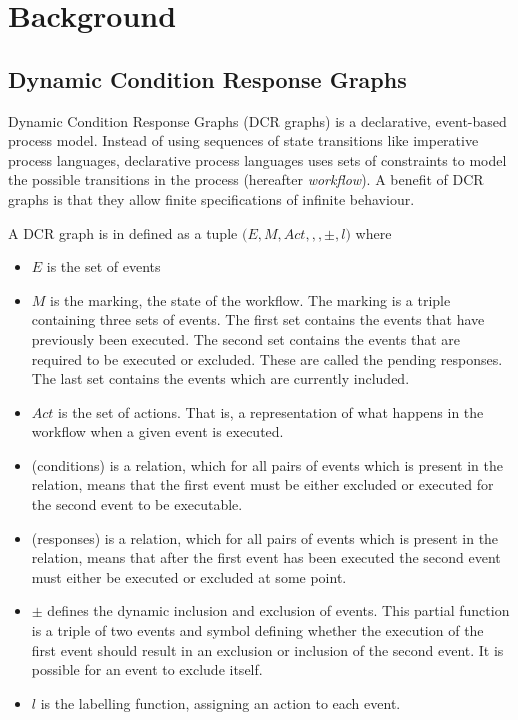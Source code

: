 \chapter{Background}\label{chap:background}
	\section{Dynamic Condition Response Graphs}\label{sec:background:dcrgraphs}
	Dynamic Condition Response Graphs (DCR graphs) is a declarative, event-based process model. Instead of using sequences of state transitions like imperative process languages, declarative process languages uses sets of constraints to model the possible transitions in the process (hereafter \textit{workflow}). A benefit of DCR graphs is that they allow finite specifications of infinite behaviour.

	
	\newpar A DCR graph is in \cite{hildebrandt2011declarative} defined as a tuple $(E, M, Act, $\condition$, $\response$, \pm, l)$ where
	\begin{itemize}
		\item $E$ is the set of events
		\item $M$ is the marking, the state of the workflow. The marking is a triple containing three sets of events. The first set contains the events that have previously been executed. The second set contains the events that are required to be executed or excluded. These are called the pending responses. The last set contains the events which are currently included.
		\item $Act$ is the set of actions. That is, a representation of what happens in the workflow when a given event is executed.
		\item \condition (conditions) is a relation, which for all pairs of events which is present in the relation, means that the first event must be either excluded or executed for the second event to be executable.
		\item \response (responses) is a relation, which for all pairs of events which is present in the relation, means that after the first event has been executed the second event must either be executed or excluded at some point.
		\item $\pm$ defines the dynamic inclusion and exclusion of events. This partial function is a triple of two events and symbol defining whether the execution of the first event should result in an exclusion or inclusion of the second event. It is possible for an event to exclude itself.
		\item $l$ is the labelling function, assigning an action to each event.
	\end{itemize}
		
